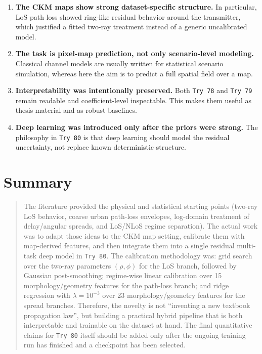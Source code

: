 \documentclass[11pt,a4paper]{article}
\begin{document}
\begin{enumerate}
\item \textbf{The CKM maps show strong dataset-specific structure.}
      In particular, LoS path loss showed ring-like residual behavior around
      the transmitter, which justified a fitted two-ray treatment instead of a
      generic uncalibrated model.

\item \textbf{The task is pixel-map prediction, not only scenario-level modeling.}
      Classical channel models are usually written for statistical scenario
      simulation, whereas here the aim is to predict a full spatial field over
      a map.

\item \textbf{Interpretability was intentionally preserved.}
      Both \texttt{Try 78} and \texttt{Try 79} remain readable and
      coefficient-level inspectable. This makes them useful as thesis material
      and as robust baselines.

\item \textbf{Deep learning was introduced only after the priors were strong.}
      The philosophy in \texttt{Try 80} is that deep learning should model the
      residual uncertainty, not replace known deterministic structure.
\end{enumerate}

\section{Summary}

\begin{quote}
The literature provided the physical and statistical starting points
(two-ray LoS behavior, coarse urban path-loss envelopes, log-domain treatment
of delay/angular spreads, and LoS/NLoS regime separation). The actual work was
to adapt those ideas to the CKM map setting, calibrate them with map-derived
features, and then integrate them into a single residual multi-task deep model
in \texttt{Try 80}. The calibration methodology was: grid search over the
two-ray parameters $(\rho, \phi)$ for the LoS branch, followed by Gaussian
post-smoothing; regime-wise linear calibration over 15 morphology/geometry
features for the path-loss branch; and ridge regression with
$\lambda = 10^{-3}$ over 23 morphology/geometry features for the spread
branches. Therefore, the novelty is not ``inventing a new textbook propagation
law'', but building a practical hybrid pipeline that is both interpretable and
trainable on the dataset at hand. The final quantitative claims for
\texttt{Try 80} itself should be added only after the ongoing training run has
finished and a checkpoint has been selected.
\end{quote}
\end{document}
